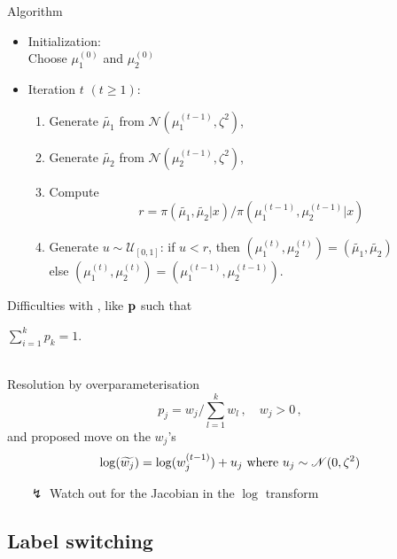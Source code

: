 \begin{slide}
\begin{block}{Algorithm}
{\sf
\begin{itemize}
\item {\sffamily Initialization:}\\
    Choose $\mu_1^{(0)}$ and $\mu_2^{(0)}$
\item  {\sffamily Iteration $t$ $(t\ge 1)$:}
\begin{enumerate}
\item Generate $\widetilde{\mu_1}$ from $\mathscr{N}\left(\mu_1^{(t-1)},\zeta^2\right)$,
\item Generate $\widetilde{\mu_2}$ from $\mathscr{N}\left(\mu_2^{(t-1)},\zeta^2\right)$,
\item Compute
$$
r={\pi\left(\widetilde{\mu_1},\widetilde{\mu_2}|x\right)}\big/{\pi\left(\mu_1^{(t-1)},\mu_2^{(t-1)}|x\right)}
$$
\item Generate $u\sim\mathscr{U}_{[0,1]}$: if $u<r$, then 
$\left(\mu_1^{(t)}, \mu_2^{(t)}\right)=\left(\widetilde{\mu_1},\widetilde{\mu_2}\right)$ \\
                 else $\left(\mu_1^{(t)},\mu_2^{(t)}\right)=\left(\mu_1^{(t-1)},\mu_2^{(t-1)}\right)$.
\end{enumerate}
\end{itemize}
}
\end{block}

\end{slide}\begin{slide}

Difficulties with , 
like $\mathbf{p}$ such that \centerline{$\sum_{i=1}^kp_k\allowbreak=1$.}\\

\vs Resolution by overparameterisation
\small$$p_j={w_j}\bigg/{\displaystyle \sum_{l=1}^kw_l}\,,\quad w_j>0\,,$$\normalsize
and proposed move on the 
$w_j$'s 
\small$$\log(\widetilde{w_j})=\log(w_j^{(t-1)})+u_j\hbox{ where }u_j\sim\mathscr{N}(0,\zeta^2)$$
\normalsize
\vs\pause
\begin{itemize}
\item[$\lightning$] Watch out for the Jacobian in the $\log$ transform
\end{itemize}

\end{slide}\subsection{Label switching}\begin{slide}


\end{slide}

